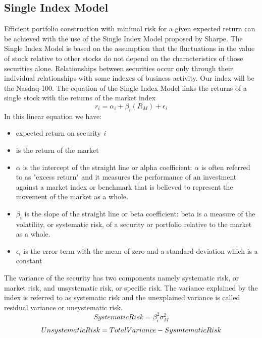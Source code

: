 \documentclass[twocolumn]{article}
\begin{document}
\subsection{Single Index Model}
Efficient portfolio construction with minimal risk for a given expected return can be achieved with the use of the Single Index Model proposed by Sharpe. The Single Index Model is based on the assumption that the fluctuations in the value of stock relative to other stocks do not depend on the characteristics of those securities alone. Relationships between securities occur only through their individual relationships with some indexes of business activity. Our index will be the Nasdaq-100. The equation of the Single Index Model links the returns of a single stock with the returns of the market index
\begin{equation}
r_i = \alpha_i + \beta_i(R_M) + \epsilon_i
\end{equation}
In this linear equation we have:
\begin{itemize}
    \item {} expected return on security \textit{i}
    \item {} is the return of the market
    \item \(\alpha\) is the intercept of the straight line or alpha coefficient: \(\alpha\) is often referred to as "excess return" and it measures the performance of an investment against a market index or benchmark that is believed to represent the movement of the market as a whole.
    \item \(\beta_i\) is the slope of the straight line or beta coefficient: beta is a measure of the volatility, or systematic risk, of a security or portfolio relative to the market as a whole. 
    \item \(\epsilon_i\) is the error term with the mean of zero and a standard deviation which is a constant
\end{itemize}
The variance of the security has two components namely systematic risk, or market risk, and unsystematic risk, or specific risk. The variance explained by the index is referred to as systematic risk and the unexplained variance is called residual variance or unsystematic risk.
\begin{equation}
Systematic Risk = \beta_i^2 \sigma_M^2
\end{equation}
\begin{equation}
\footnotesize{Unsystematic Risk = Total Variance - Sysmtematic Risk}
\end{equation}
\end{document}
